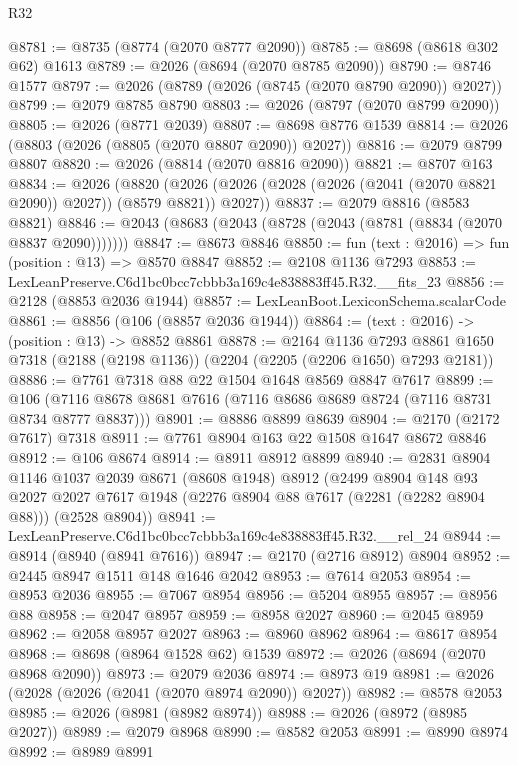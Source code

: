 \begin{lexlean}{R32}
\begin{coremodule}
@8781 := @8735 (@8774 (@2070 @8777 @2090))
@8785 := @8698 (@8618 @302 @62) @1613
@8789 := @2026 (@8694 (@2070 @8785 @2090))
@8790 := @8746 @1577
@8797 := @2026 (@8789 (@2026 (@8745 (@2070 @8790 @2090)) @2027))
@8799 := @2079 @8785 @8790
@8803 := @2026 (@8797 (@2070 @8799 @2090))
@8805 := @2026 (@8771 @2039)
@8807 := @8698 @8776 @1539
@8814 := @2026 (@8803 (@2026 (@8805 (@2070 @8807 @2090)) @2027))
@8816 := @2079 @8799 @8807
@8820 := @2026 (@8814 (@2070 @8816 @2090))
@8821 := @8707 @163
@8834 := @2026
    (@8820 (@2026 (@2026 (@2028 (@2026 (@2041 (@2070 @8821 @2090)) @2027)) (@8579 @8821)) @2027))
@8837 := @2079 @8816 (@8583 @8821)
@8846 := @2043 (@8683 (@2043 (@8728 (@2043 (@8781 (@8834 (@2070 @8837 @2090)))))))
@8847 := @8673 @8846
@8850 := fun (text : @2016) => fun (position : @13) => @8570 @8847
@8852 := @2108 @1136 @7293
@8853 := LexLeanPreserve.C6d1bc0bcc7cbbb3a169c4e838883ff45.R32.__fits_23
@8856 := @2128 (@8853 @2036 @1944)
@8857 := LexLeanBoot.LexiconSchema.scalarCode
@8861 := @8856 (@106 (@8857 @2036 @1944))
@8864 := (text : @2016) -> (position : @13) -> @8852 @8861
@8878 := @2164
    @1136
    @7293
    @8861
    @1650
    @7318
    (@2188 (@2198 @1136))
    (@2204 (@2205 (@2206 @1650) @7293 @2181))
@8886 := @7761 @7318 @88 @22 @1504 @1648 @8569 @8847 @7617
@8899 := @106 (@7116 @8678 @8681 @7616 (@7116 @8686 @8689 @8724 (@7116 @8731 @8734 @8777 @8837)))
@8901 := @8886 @8899 @8639
@8904 := @2170 (@2172 @7617) @7318
@8911 := @7761 @8904 @163 @22 @1508 @1647 @8672 @8846
@8912 := @106 @8674
@8914 := @8911 @8912 @8899
@8940 := @2831
    @8904
    @1146
    @1037
    @2039
    @8671
    (@8608 @1948)
    @8912
    (@2499
      @8904
      @148
      @93
      @2027
      @2027
      @7617
      @1948
      (@2276 @8904 @88 @7617 (@2281 (@2282 @8904 @88)))
      (@2528 @8904))
@8941 := LexLeanPreserve.C6d1bc0bcc7cbbb3a169c4e838883ff45.R32.__rel_24
@8944 := @8914 (@8940 (@8941 @7616))
@8947 := @2170 (@2716 @8912) @8904
@8952 := @2445 @8947 @1511 @148 @1646 @2042
@8953 := @7614 @2053
@8954 := @8953 @2036
@8955 := @7067 @8954
@8956 := @5204 @8955
@8957 := @8956 @88
@8958 := @2047 @8957
@8959 := @8958 @2027
@8960 := @2045 @8959
@8962 := @2058 @8957 @2027
@8963 := @8960 @8962
@8964 := @8617 @8954
@8968 := @8698 (@8964 @1528 @62) @1539
@8972 := @2026 (@8694 (@2070 @8968 @2090))
@8973 := @2079 @2036
@8974 := @8973 @19
@8981 := @2026 (@2028 (@2026 (@2041 (@2070 @8974 @2090)) @2027))
@8982 := @8578 @2053
@8985 := @2026 (@8981 (@8982 @8974))
@8988 := @2026 (@8972 (@8985 @2027))
@8989 := @2079 @8968
@8990 := @8582 @2053
@8991 := @8990 @8974
@8992 := @8989 @8991

\end{coremodule}
\end{lexlean}
